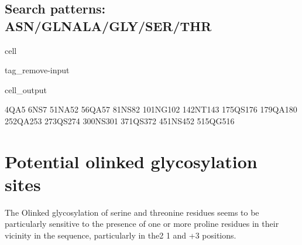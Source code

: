 \documentclass[letterpaper,10pt,english]{jupyterBook}
\begin{document}
\subsection{Search patterns: ASN/GLN\sphinxhyphen{}ALA/GLY/SER/THR}
\label{\detokenize{ipynb/chapter2:search-patterns-asn-gln-ala-gly-ser-thr}}
\begin{sphinxuseclass}{cell}
\begin{sphinxuseclass}{tag_remove-input}\begin{sphinxVerbatimOutput}

\begin{sphinxuseclass}{cell_output}
\begin{sphinxVerbatim}[commandchars=\\\{\}]
4\PYGZhy{}QA\PYGZhy{}5
6\PYGZhy{}NS\PYGZhy{}7
51\PYGZhy{}NA\PYGZhy{}52
56\PYGZhy{}QA\PYGZhy{}57
81\PYGZhy{}NS\PYGZhy{}82
101\PYGZhy{}NG\PYGZhy{}102
142\PYGZhy{}NT\PYGZhy{}143
175\PYGZhy{}QS\PYGZhy{}176
179\PYGZhy{}QA\PYGZhy{}180
252\PYGZhy{}QA\PYGZhy{}253
273\PYGZhy{}QS\PYGZhy{}274
300\PYGZhy{}NS\PYGZhy{}301
371\PYGZhy{}QS\PYGZhy{}372
451\PYGZhy{}NS\PYGZhy{}452
515\PYGZhy{}QG\PYGZhy{}516
\end{sphinxVerbatim}

\end{sphinxuseclass}\end{sphinxVerbatimOutput}

\end{sphinxuseclass}
\end{sphinxuseclass}

\section{Potential o\sphinxhyphen{}linked glycosylation sites}
\label{\detokenize{ipynb/chapter2:potential-o-linked-glycosylation-sites}}
\sphinxAtStartPar
The O\sphinxhyphen{}linked glycosylation of serine and threonine residues seems to be particularly sensitive to
the presence of one or more proline residues in their vicinity in the sequence, particularly in the2
\sphinxhyphen{}1 and +3 positions.
\end{document}
